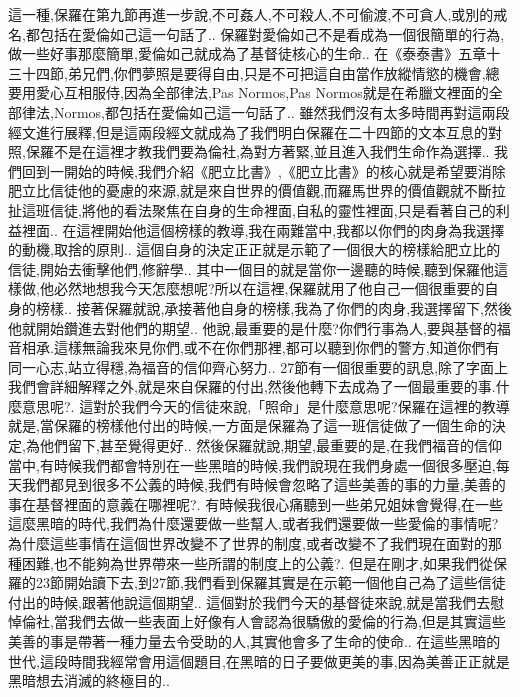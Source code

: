 \documentclass{book}
\begin{document}
這一種,保羅在第九節再進一步說,不可姦人,不可殺人,不可偷渡,不可貪人,或別的戒名,都包括在愛倫如己這一句話了..
保羅對愛倫如己不是看成為一個很簡單的行為,做一些好事那麼簡單,愛倫如己就成為了基督徒核心的生命..
在《泰泰書》五章十三十四節,弟兄們,你們夢照是要得自由,只是不可把這自由當作放縱情慾的機會,總要用愛心互相服侍,因為全部律法,Pas Normos,Pas Normos就是在希臘文裡面的全部律法,Normos,都包括在愛倫如己這一句話了..
雖然我們沒有太多時間再對這兩段經文進行展釋,但是這兩段經文就成為了我們明白保羅在二十四節的文本互息的對照,保羅不是在這裡才教我們要為倫社,為對方著緊,並且進入我們生命作為選擇..
我們回到一開始的時候,我們介紹《肥立比書》,《肥立比書》的核心就是希望要消除肥立比信徒他的憂慮的來源,就是來自世界的價值觀,而羅馬世界的價值觀就不斷拉扯這班信徒,將他的看法聚焦在自身的生命裡面,自私的靈性裡面,只是看著自己的利益裡面..
在這裡開始他這個榜樣的教導,我在兩難當中,我都以你們的肉身為我選擇的動機,取捨的原則..
這個自身的決定正正就是示範了一個很大的榜樣給肥立比的信徒,開始去衝擊他們,修辭學..
其中一個目的就是當你一邊聽的時候,聽到保羅他這樣做,他必然地想我今天怎麼想呢?所以在這裡,保羅就用了他自己一個很重要的自身的榜樣..
接著保羅就說,承接著他自身的榜樣,我為了你們的肉身,我選擇留下,然後他就開始鑽進去對他們的期望..
他說,最重要的是什麼?你們行事為人,要與基督的福音相承.這樣無論我來見你們,或不在你們那裡,都可以聽到你們的警方,知道你們有同一心志,站立得穩,為福音的信仰齊心努力..
27節有一個很重要的訊息,除了字面上我們會詳細解釋之外,就是來自保羅的付出,然後他轉下去成為了一個最重要的事.什麼意思呢?.
這對於我們今天的信徒來說,「照命」是什麼意思呢?保羅在這裡的教導就是,當保羅的榜樣他付出的時候,一方面是保羅為了這一班信徒做了一個生命的決定,為他們留下,甚至覺得更好..
然後保羅就說,期望,最重要的是,在我們福音的信仰當中,有時候我們都會特別在一些黑暗的時候,我們說現在我們身處一個很多壓迫,每天我們都見到很多不公義的時候,我們有時候會忽略了這些美善的事的力量,美善的事在基督裡面的意義在哪裡呢?.
有時候我很心痛聽到一些弟兄姐妹會覺得,在一些這麼黑暗的時代,我們為什麼還要做一些幫人,或者我們還要做一些愛倫的事情呢?為什麼這些事情在這個世界改變不了世界的制度,或者改變不了我們現在面對的那種困難,也不能夠為世界帶來一些所謂的制度上的公義?.
但是在剛才,如果我們從保羅的23節開始讀下去,到27節,我們看到保羅其實是在示範一個他自己為了這些信徒付出的時候,跟著他說這個期望..
這個對於我們今天的基督徒來說,就是當我們去慰悼倫社,當我們去做一些表面上好像有人會認為很驕傲的愛倫的行為,但是其實這些美善的事是帶著一種力量去令受助的人,其實他會多了生命的使命..
在這些黑暗的世代,這段時間我經常會用這個題目,在黑暗的日子要做更美的事,因為美善正正就是黑暗想去消滅的終極目的..
\end{document}
